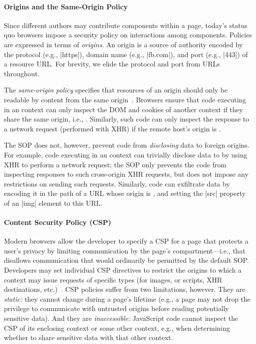 \paragraph{Origins and the Same-Origin Policy}
Since different authors may contribute components within a page,
today's status quo browsers impose a security policy on interactions
among components. Policies are expressed in terms of \emph{origins}.
An origin is a source of authority encoded by the protocol (e.g.,
\js|https|), domain name (e.g., \js|fb.com|), and port (e.g., \js|443|)
of a resource URL. For brevity, we elide the protocol and
port from URLs throughout.

The {\em same-origin policy} specifies that resources of an
origin should only be readable by content from the same
origin~\cite{rfc6454, googlehandbook, VanKesteren2012}.  Browsers
ensure that code executing in an  context can only
inspect the DOM and cookies of another context if they share the same
 origin, i.e., . Similarly, such code can only inspect
the response to a network request (performed with XHR) if the remote
host's origin is .
%
 
The SOP does not, however, prevent code from \emph{disclosing} data to
foreign origins. For example, code executing in an 
context can trivially disclose data to  by using XHR to
perform a network request; the SOP only prevents the code from
inspecting responses to such cross-origin XHR requests, but does not
impose any restrictions on sending such requests.
Similarly, code can exfiltrate data by encoding it in the path of a
URL whose origin is , and setting the \js|src| property
of an \js|img| element to this URL.

\paragraph{Content Security Policy (CSP)}

Modern browsers allow the developer to specify a CSP for a page that
protects a user's privacy by limiting communication by the page's
compartment---i.e., that disallows communication that would ordinarily
be permitted by the default SOP.  Developers may set individual CSP
directives to restrict the origins to which a context may issue
requests of specific types (for images, or scripts, XHR destinations,
etc.)~\cite{csp}. CSP policies suffer from two limitations,
however. They are {\em static:} they cannot change during a page's
lifetime (e.g., a page may not drop the privilege to communicate with
untrusted origins before reading potentially sensitive data). And they
are {\em inaccessible:} JavaScript code cannot inspect the CSP of its
enclosing context or some other context, e.g., when determining
whether to share sensitive data with that other context.

